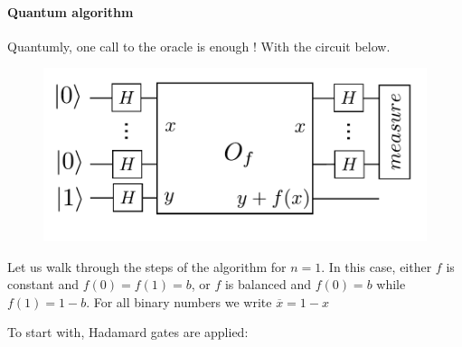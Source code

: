 \documentclass{article}
\begin{document}
\paragraph{Quantum algorithm} Quantumly, one call to the oracle is enough ! With
the circuit below.

\begin{center}
\begin{figure}
\includegraphics[width=.6\textwidth]{deutsch_josza.pdf}
\end{figure}
\end{center}

Let us walk through the steps of the algorithm for $n=1$.
In this case, either $f$ is constant and $f(0)=f(1)=b$, 
or $f$ is balanced and $f(0)=b$ while $f(1)=1-b$.
For all binary numbers we write $\overline{x}=1-x$

To start with, Hadamard gates are applied:
\end{document}
